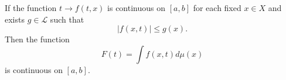 \begin{corollary}
    If the function $t \to f(t,x)$ is continuous on $[a,b]$ for each fixed 
    $x \in X$ and exists $g \in \mathscr{L}$ such that 
    $$
        |f(x,t)| \leq g(x).
    $$
    Then the function
    $$
        F(t) = \displaystyle \int f(x,t)d\mu(x)
    $$
    is continuous on $[a,b]$.
\end{corollary}


